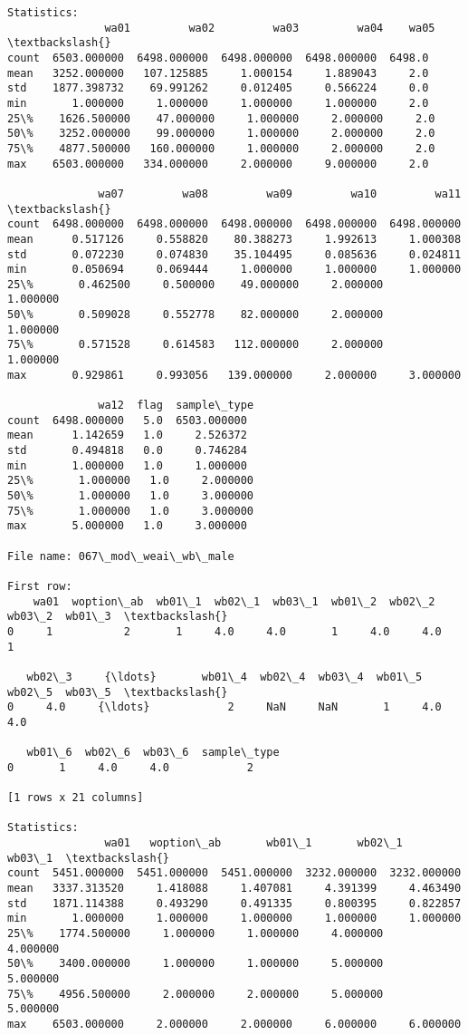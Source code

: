 \documentclass[11pt]{article}
\begin{document}
\begin{Verbatim}[commandchars=\\\{\}]
Statistics: 
               wa01         wa02         wa03         wa04    wa05  \textbackslash{}
count  6503.000000  6498.000000  6498.000000  6498.000000  6498.0   
mean   3252.000000   107.125885     1.000154     1.889043     2.0   
std    1877.398732    69.991262     0.012405     0.566224     0.0   
min       1.000000     1.000000     1.000000     1.000000     2.0   
25\%    1626.500000    47.000000     1.000000     2.000000     2.0   
50\%    3252.000000    99.000000     1.000000     2.000000     2.0   
75\%    4877.500000   160.000000     1.000000     2.000000     2.0   
max    6503.000000   334.000000     2.000000     9.000000     2.0   

              wa07         wa08         wa09         wa10         wa11  \textbackslash{}
count  6498.000000  6498.000000  6498.000000  6498.000000  6498.000000   
mean      0.517126     0.558820    80.388273     1.992613     1.000308   
std       0.072230     0.074830    35.104495     0.085636     0.024811   
min       0.050694     0.069444     1.000000     1.000000     1.000000   
25\%       0.462500     0.500000    49.000000     2.000000     1.000000   
50\%       0.509028     0.552778    82.000000     2.000000     1.000000   
75\%       0.571528     0.614583   112.000000     2.000000     1.000000   
max       0.929861     0.993056   139.000000     2.000000     3.000000   

              wa12  flag  sample\_type  
count  6498.000000   5.0  6503.000000  
mean      1.142659   1.0     2.526372  
std       0.494818   0.0     0.746284  
min       1.000000   1.0     1.000000  
25\%       1.000000   1.0     2.000000  
50\%       1.000000   1.0     3.000000  
75\%       1.000000   1.0     3.000000  
max       5.000000   1.0     3.000000  

File name: 067\_mod\_weai\_wb\_male

First row: 
    wa01  woption\_ab  wb01\_1  wb02\_1  wb03\_1  wb01\_2  wb02\_2  wb03\_2  wb01\_3  \textbackslash{}
0     1           2       1     4.0     4.0       1     4.0     4.0       1   

   wb02\_3     {\ldots}       wb01\_4  wb02\_4  wb03\_4  wb01\_5  wb02\_5  wb03\_5  \textbackslash{}
0     4.0     {\ldots}            2     NaN     NaN       1     4.0     4.0   

   wb01\_6  wb02\_6  wb03\_6  sample\_type  
0       1     4.0     4.0            2  

[1 rows x 21 columns]

Statistics: 
               wa01   woption\_ab       wb01\_1       wb02\_1       wb03\_1  \textbackslash{}
count  5451.000000  5451.000000  5451.000000  3232.000000  3232.000000   
mean   3337.313520     1.418088     1.407081     4.391399     4.463490   
std    1871.114388     0.493290     0.491335     0.800395     0.822857   
min       1.000000     1.000000     1.000000     1.000000     1.000000   
25\%    1774.500000     1.000000     1.000000     4.000000     4.000000   
50\%    3400.000000     1.000000     1.000000     5.000000     5.000000   
75\%    4956.500000     2.000000     2.000000     5.000000     5.000000   
max    6503.000000     2.000000     2.000000     6.000000     6.000000   


\end{Verbatim}
\end{document}
